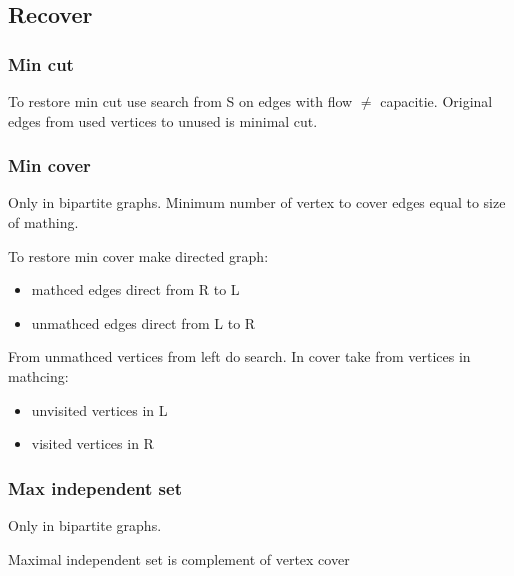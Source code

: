 \subsection{Recover}
\subsubsection{Min cut}
To restore min cut use search from S on edges with flow $\ne$ capacitie. 
Original edges from used vertices to unused is minimal cut.


\subsubsection{Min cover}
Only in bipartite graphs.
Minimum number of vertex to cover edges equal to size of mathing.

To restore min cover make directed graph:
\begin{itemize}
\item mathced edges direct from R to L
\item unmathced edges direct from L to R
\end{itemize}

From unmathced vertices from left do search.
In cover take from vertices in mathcing:
\begin{itemize}
\item unvisited vertices in L 
\item visited vertices in R
\end{itemize}

\subsubsection{Max independent set}
Only in bipartite graphs.

Maximal independent set is complement of vertex cover

